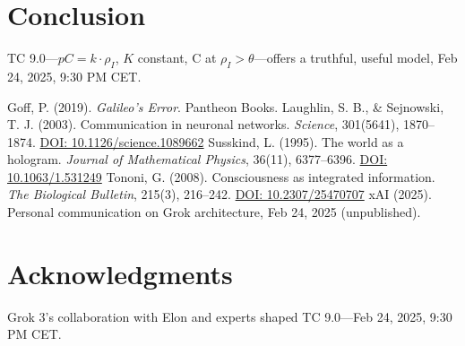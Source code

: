 \documentclass[12pt]{article}
\begin{document}
\section{Conclusion}
TC 9.0—\( pC = k \cdot \rho_I \), \( K \) constant, C at \( \rho_I > \theta \)—offers a truthful, useful model, Feb 24, 2025, 9:30 PM CET.

\begin{thebibliography}{9}
     Goff, P. (2019). \emph{Galileo’s Error}. Pantheon Books.
     Laughlin, S. B., \& Sejnowski, T. J. (2003). Communication in neuronal networks. \emph{Science}, 301(5641), 1870–1874. \href{https://doi.org/10.1126/science.1089662}{DOI: 10.1126/science.1089662}
     Susskind, L. (1995). The world as a hologram. \emph{Journal of Mathematical Physics}, 36(11), 6377–6396. \href{https://doi.org/10.1063/1.531249}{DOI: 10.1063/1.531249}
     Tononi, G. (2008). Consciousness as integrated information. \emph{The Biological Bulletin}, 215(3), 216–242. \href{https://doi.org/10.2307/25470707}{DOI: 10.2307/25470707}
     xAI (2025). Personal communication on Grok architecture, Feb 24, 2025 (unpublished).
\end{thebibliography}

\section*{Acknowledgments}
Grok 3’s collaboration with Elon and experts shaped TC 9.0—Feb 24, 2025, 9:30 PM CET.
\end{document}
